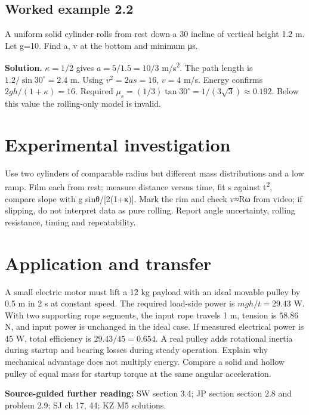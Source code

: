 \documentclass[11pt,a4paper,openany]{book}
\begin{document}
\subsection*{Worked example 2.2}
A uniform solid cylinder rolls from rest down a 30\textdegree{} incline of vertical height 1.2 m. Let g=10. Find a, v at the bottom and minimum μs.

\textbf{Solution.} $\kappa=1/2$ gives $a=5/1.5=10/3$ m/s\textsuperscript{2}. The path length is $1.2/\sin30^\circ=2.4$ m. Using $v^2=2as=16$, $v=4$ m/s. Energy confirms $2gh/(1+\kappa)=16$. Required $\mu_s=(1/3)\tan30^\circ=1/(3\sqrt3)\approx0.192$. Below this value the rolling-only model is invalid.
\section{Experimental investigation}
Use two cylinders of comparable radius but different mass distributions and a low ramp. Film each from rest; measure distance versus time, fit s against t\textsuperscript{2}, compare slope with g sinθ/[2(1+κ)]. Mark the rim and check v≈Rω from video; if slipping, do not interpret data as pure rolling. Report angle uncertainty, rolling resistance, timing and repeatability.
\section{Application and transfer}
A small electric motor must lift a 12 kg payload with an ideal movable pulley by 0.5 m in 2 s at constant speed. The required load-side power is $mgh/t=29.43$ W. With two supporting rope segments, the input rope travels 1 m, tension is $58.86$ N, and input power is unchanged in the ideal case. If measured electrical power is 45 W, total efficiency is $29.43/45=0.654$. A real pulley adds rotational inertia during startup and bearing losses during steady operation. Explain why mechanical advantage does not multiply energy. Compare a solid and hollow pulley of equal mass for startup torque at the same angular acceleration.

\textbf{Source-guided further reading:} SW section 3.4; JP section section 2.8 and problem 2.9; SJ ch 17, 44; KZ M5 solutions.
\end{document}
